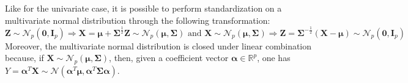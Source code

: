 \documentclass{report}
\begin{document}
\noindent Like for the univariate case, it is possible to perform standardization on a multivariate normal distribution through the following transformation:
\[\mathbf{Z} \sim \mathcal{N}_p(\mathbf{0}, \mathbf{I}_p) \Rightarrow \mathbf{X} = \mathbf{\mu} + \mathbf{\Sigma}^{\frac{1}{2}}\mathbf{Z} \sim \mathcal{N}_p(\mathbf{\mu}, \mathbf{\Sigma}) \text{ and } \mathbf{X} \sim \mathcal{N}_p(\mathbf{\mu}, \mathbf{\Sigma}) \Rightarrow \mathbf{Z} = \mathbf{\Sigma}^{-\frac{1}{2}}(\mathbf{X} - \mathbf{\mu}) \sim \mathcal{N}_p(\mathbf{0}, \mathbf{I}_p)\]
Moreover, the multivariate normal distribution is closed under linear combination because, if $\displaystyle \mathbf{X} \sim \mathcal{N}_p(\mathbf{\mu}, \mathbf{\Sigma})$, then, given a coefficient vector $\displaystyle \mathbf{\alpha} \in \mathbb{R}^p$, one has $\displaystyle Y = \mathbf{\alpha}^T\mathbf{X} \sim \mathcal{N}(\mathbf{\alpha}^T\mathbf{\mu}, \mathbf{\alpha}^T\mathbf{\Sigma\alpha})$.
\end{document}
